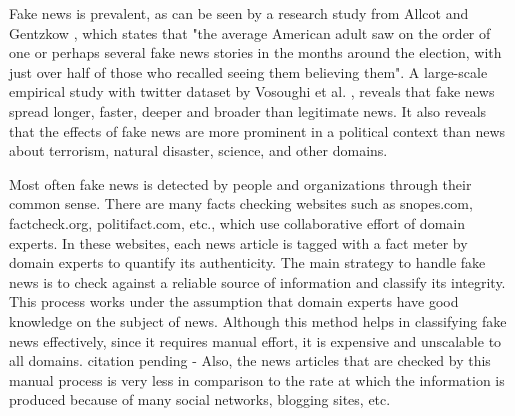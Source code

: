 \documentclass[a4paper, 11pt]{article}
\begin{document}
Fake news is prevalent, as can be seen by a research study from Allcot and Gentzkow \parencite{Allcott2017}, which states that "the average American adult saw on the order of one or perhaps several fake news stories in the months around the election, with just over half of those who recalled seeing them believing them". A large-scale empirical study with twitter dataset by Vosoughi et al. \parencite{Vosoughi1146}, reveals that fake news spread longer, faster, deeper and broader than legitimate news. It also reveals that the effects of fake news are more prominent in a political context than news about terrorism, natural disaster, science, and other domains.

Most often fake news is detected by people and organizations through their common sense. There are many facts checking websites such as snopes.com, factcheck.org, politifact.com, etc., which use collaborative effort of domain experts. In these websites, each news article is tagged with a fact meter by domain experts to quantify its authenticity. The main strategy to handle fake news is to check against a reliable source of information and classify its integrity. This process works under the assumption that domain experts have good knowledge on the subject of news. Although this method helps in classifying fake news effectively, since it requires manual effort, it is expensive and unscalable to all domains. \color{red}citation pending - Also, the news articles that are checked by this manual process is very less in comparison to the rate at which the information is produced because of many social networks, blogging sites, etc.\color{black}
\end{document}
